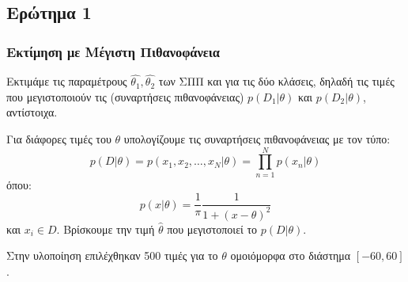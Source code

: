 \documentclass{beamer}
\begin{document}
\subsection{Ερώτημα 1}
\begin{frame}
\frametitle{Εκτίμηση με Μέγιστη Πιθανοφάνεια}

Εκτιμάμε τις παραμέτρους $\hat{\theta_1}, \hat{\theta_2}$ των ΣΠΠ και για τις δύο 
κλάσεις, δηλαδή τις τιμές που μεγιστοποιούν τις (συναρτήσεις πιθανοφάνειας) $p(D_1|\theta)$ και $p(D_2|\theta)$,
αντίστοιχα.

Για διάφορες τιμές του $\theta$ υπολογίζουμε τις συναρτήσεις πιθανοφάνειας με τον τύπο:
\begin{equation}
    p(D|\theta) = p(x_1, x_2, \dots, x_N | \theta) = \prod_{n=1}^N p(x_n | \theta) 
    \label{eq:1}
\end{equation}
όπου: 
\begin{equation}
    p(x|\theta) = \frac{1}{\pi} \frac{1}{1+(x-\theta)^2}
    \label{eq:2}
\end{equation}
και $x_i \in D$.
Βρίσκουμε την τιμή $\hat{\theta}$ που μεγιστοποιεί  το $p(D|\theta)$.

Στην υλοποίηση επιλέχθηκαν 500 τιμές για το $\theta$ ομοιόμορφα στο διάστημα $[-60,60]$.


\end{frame}
\end{document}
